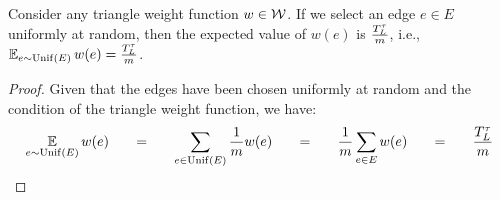 \begin{lemma}\label{Lemma: Weight Function Expectation}
    Consider any triangle weight function $w \in \mathcal{W}$. If we select an edge $e \in E$ uniformly at random, then the expected value of $w(e)$ is $\frac{T^{\tau}_{L}}{m}$, i.e., $\operatorname*{\mathbb{E}}_{e \sim \mathrm{Unif}(E)} w(e) = \frac{T^{\tau}_{L}}{m}$.

    \begin{proof}
        Given that the edges have been chosen uniformly at random and the condition of the triangle weight function, we have:
        $$\operatorname*{\mathbb{E}}_{e \sim \mathrm{Unif}(E)} w(e) ~~~~~ = ~~~~~ \sum_{e \in \mathrm{Unif}(E)} \frac{1}{m} w(e)  ~~~~~ = ~~~~~ \frac{1}{m} \sum_{e \in E} w(e) ~~~~~ = ~~~~~ \frac{T^{\tau}_{L}}{m}$$
    \end{proof}
\end{lemma}


